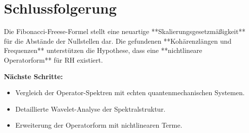 \documentclass[a4paper,12pt]{article}
\begin{document}
\section{Schlussfolgerung}
Die Fibonacci-Freese-Formel stellt eine neuartige **Skalierungsgesetzmäßigkeit** für die Abstände der Nullstellen dar.
Die gefundenen **Kohärenzlängen und Frequenzen** unterstützen die Hypothese, dass eine **nichtlineare Operatorform** für RH existiert.

\textbf{Nächste Schritte:}
\begin{itemize}
    \item Vergleich der Operator-Spektren mit echten quantenmechanischen Systemen.
    \item Detaillierte Wavelet-Analyse der Spektralstruktur.
    \item Erweiterung der Operatorform mit nichtlinearen Terme.
\end{itemize}
\end{document}
